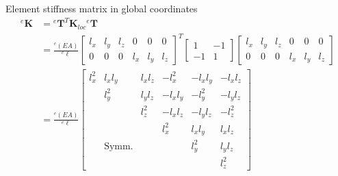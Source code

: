 \documentclass[aspectratio=169]{beamer}
\begin{document}
\begin{frame}{Element stiffness matrix in global coordinates}
  \vspace{-1cm}
  \begin{align*}
    {}^e\mathbf{K} & = {}^e\mathbf T^T \mathbf{K}_{loc} {}^e\mathbf T                                                                            \\
                   & = \frac{{}^e(EA)}{{}^e\ell} \begin{bmatrix}
                                                   l_x & l_y & l_z & 0   & 0   & 0   \\
                                                   0   & 0   & 0   & l_x & l_y & l_z
                                                 \end{bmatrix}^T\begin{bmatrix} 1 & -1 \\ -1 & 1 \end{bmatrix} \begin{bmatrix}
                                                                                                                 l_x & l_y & l_z & 0   & 0   & 0   \\
                                                                                                                 0   & 0   & 0   & l_x & l_y & l_z
                                                                                                               \end{bmatrix} \\
                   & =\frac{{}^e(EA)}{{}^e\ell}
    \begin{bmatrix}
      l_x^2 & l_x l_y      & l_x l_z & -l_x^2   & -l_x l_y & -l_x l_z \\
            & l_y^2        & l_y l_z & -l_x l_y & -l_y^2   & -l_y l_z \\
            &              & l_z^2   & -l_x l_z & -l_y l_z & -l_z^2   \\
            &              &         & l_x^2    & l_x l_y  & l_x l_z  \\
            & \text{Symm.} &         &          & l_y^2    & l_y l_z  \\
            &              &         &          &          & l_z^2
    \end{bmatrix}
  \end{align*}
\end{frame}
\end{document}
